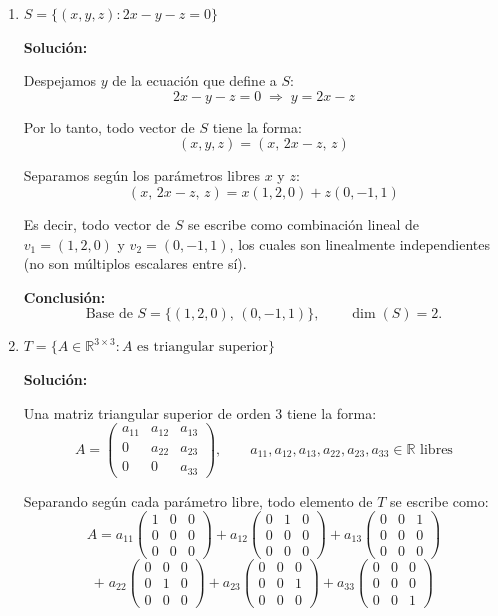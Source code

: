 \documentclass[12pt]{article}
\newcommand{\solucion}{%
    \vspace{0.8em}%
    \textbf{Solución:}%
    \vspace{0.8em}%
}
\begin{document}
\begin{enumerate}[label=\alph*.-]
    \item $S = \{(x,y,z): 2x - y - z = 0\}$

    \solucion

    Despejamos $y$ de la ecuación que define a $S$:
    \[
    2x-y-z=0 \;\Longrightarrow\; y=2x-z
    \]

    Por lo tanto, todo vector de $S$ tiene la forma:
    \[
    (x,y,z) = (x,\,2x-z,\,z)
    \]

    Separamos según los parámetros libres $x$ y $z$:
    \[
    (x,\,2x-z,\,z) = x(1,2,0)+z(0,-1,1)
    \]

    Es decir, todo vector de $S$ se escribe como combinación lineal de $v_1=(1,2,0)$ y $v_2=(0,-1,1)$, los cuales son linealmente independientes (no son múltiplos escalares entre sí).

    \textbf{Conclusión:}
    \[
    \text{Base de } S = \{(1,2,0),\,(0,-1,1)\}, \qquad \dim(S) = 2.
    \]

    \item $T = \{A \in \mathbb{R}^{3\times3}: A \text{ es triangular superior}\}$

    \solucion

    Una matriz triangular superior de orden 3 tiene la forma:
    \[
    A = \begin{pmatrix} a_{11} & a_{12} & a_{13} \\ 0 & a_{22} & a_{23} \\ 0 & 0 & a_{33} \end{pmatrix}, \qquad a_{11},a_{12},a_{13},a_{22},a_{23},a_{33} \in \mathbb{R} \text{ libres}
    \]

    Separando según cada parámetro libre, todo elemento de $T$ se escribe como:
    \[
    A = a_{11}\begin{pmatrix}1&0&0\\0&0&0\\0&0&0\end{pmatrix} + a_{12}\begin{pmatrix}0&1&0\\0&0&0\\0&0&0\end{pmatrix} + a_{13}\begin{pmatrix}0&0&1\\0&0&0\\0&0&0\end{pmatrix}
    \]
    \[
    + \; a_{22}\begin{pmatrix}0&0&0\\0&1&0\\0&0&0\end{pmatrix} + a_{23}\begin{pmatrix}0&0&0\\0&0&1\\0&0&0\end{pmatrix} + a_{33}\begin{pmatrix}0&0&0\\0&0&0\\0&0&1\end{pmatrix}
    \]


\end{enumerate}
\end{document}
